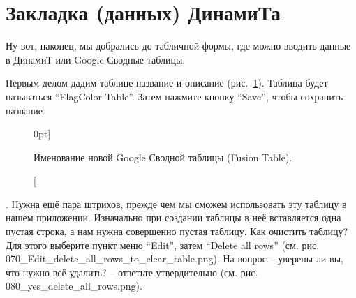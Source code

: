 \section{Закладка (данных) ДинамиТа}

Ну вот, наконец, мы добрались до табличной формы, 
где можно вводить данные в ДинамиТ или Google Сводные таблицы.

Первым делом дадим таблице название и описание (рис.~\ref{fig:fusion_table_name}). 
Таблица будет называться ``FlagColor Table''. Затем нажмите кнопку ``Save'', чтобы сохранить название.

\begin{figure}
{
\setlength{\fboxsep}{0pt}%
\setlength{\fboxrule}{1pt}%
}
    \caption[Переименование Google Сводной таблицы.][0pt]{Именование новой 
            Google Сводной таблицы (Fusion Table).

            { 
            }
    }
  \label{fig:fusion_table_name}
\end{figure}


. Нужна ещё пара штрихов, прежде чем мы сможем использовать эту таблицу в нашем приложении. 
Изначально при создании таблицы в неё вставляется одна пустая строка, а нам нужна совершенно пустая таблицу. Как очистить таблицу? 
Для этого выберите пункт меню ``Edit'', затем ``Delete all rows'' (см. рис. 070\_Edit\_delete\_all\_rows\_to\_clear\_table.png). 
На вопрос -- уверены ли вы, что нужно всё удалить? -- ответьте утвердительно (см. рис. 080\_yes\_delete\_all\_rows.png).


